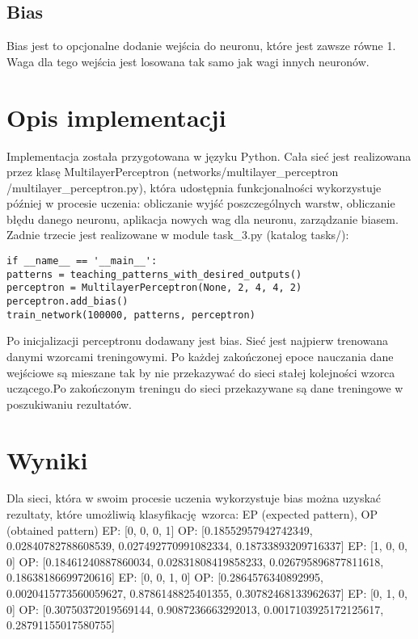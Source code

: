 \documentclass{classrep}
\begin{document}
{{\subsection{Bias}
Bias jest to opcjonalne dodanie wejścia do neuronu, które jest zawsze równe 1. Waga dla tego wejścia jest losowana tak samo jak wagi innych neuronów.                                                                                                       
}

\section{Opis implementacji}
{Implementacja została przygotowana w języku Python. Cała sieć jest realizowana przez klasę MultilayerPerceptron (networks\slash multilayer{\_}perceptron
\slash multilayer{\_}perceptron.py),
która udostępnia funkcjonalności wykorzystuje później w procesie uczenia: obliczanie wyjść poszczególnych warstw, obliczanie błędu danego neuronu, aplikacja nowych wag dla neuronu, zarządzanie biasem. Zadnie trzecie jest realizowane w module task{\_}3.py (katalog tasks\slash):
\begin{lstlisting}
if __name__ == '__main__':
patterns = teaching_patterns_with_desired_outputs()
perceptron = MultilayerPerceptron(None, 2, 4, 4, 2)
perceptron.add_bias()
train_network(100000, patterns, perceptron)
\end{lstlisting}
Po inicjalizacji perceptronu dodawany jest bias. Sieć jest najpierw trenowana danymi wzorcami treningowymi. Po każdej zakończonej epoce nauczania dane wejściowe są mieszane tak by nie przekazywać do sieci stałej kolejności wzorca uczącego.Po zakończonym treningu do sieci przekazywane są dane treningowe w poszukiwaniu rezultatów.
}

\section{Wyniki}
{Dla sieci, która w swoim procesie uczenia wykorzystuje bias można uzyskać rezultaty, które umożliwią klasyfikację wzorca: \newline
EP (expected pattern), OP (obtained pattern)\newline
EP: [0, 0, 0, 1] \newline
OP: [0.18552957942742349, 0.02840782788608539, 0.027492770991082334, 0.18733893209716337]\newline
EP: [1, 0, 0, 0]\newline
OP: [0.18461240887860034, 0.02831808419858233, 0.026795896877811618, 0.18638186699720616]\newline
EP: [0, 0, 1, 0]\newline
OP: [0.2864576340892995, 0.0020415773560059627, 0.8786148825401355, 0.30782468133962637]\newline
EP: [0, 1, 0, 0]\newline
OP: [0.30750372019569144, 0.9087236663292013, 0.0017103925172125617, 0.28791155017580755] \newline

}}
\end{document}
